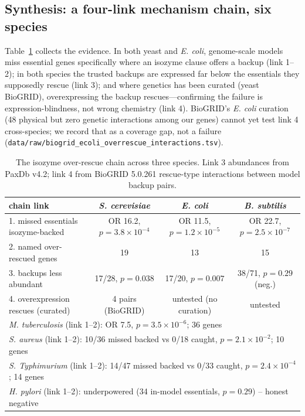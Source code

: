 \documentclass[12pt]{article}
\begin{document}
\subsection{Synthesis: a four-link mechanism chain, six species}
Table~\ref{tab:chain} collects the evidence. In both yeast and
\emph{E. coli}, genome-scale models miss essential genes specifically
where an isozyme clause offers a backup (link 1--2); in both species the
trusted backups are expressed far below the essentials they supposedly
rescue (link 3); and where genetics has been curated (yeast BioGRID),
overexpressing the backup rescues---confirming the failure is
expression-blindness, not wrong chemistry (link 4). BioGRID's
\emph{E. coli} curation (48 physical but zero genetic interactions
among our genes) cannot yet test link 4 cross-species; we record that
as a coverage gap, not a failure
(\texttt{data/raw/biogrid\_ecoli\_overrescue\_interactions.tsv}).
\begin{table}[h]
\centering\small
\begin{tabular}{lccc}
\hline\hline
chain link & \emph{S. cerevisiae} & \emph{E. coli} & \emph{B. subtilis} \\
\hline
1. missed essentials isozyme-backed & OR 16.2, $p=3.8\times10^{-4}$ & OR 11.5, $p=1.2\times10^{-5}$ & OR 22.7, $p=2.5\times10^{-7}$ \\
2. named over-rescued genes & 19 & 13 & 15 \\
3. backups less abundant & 17/28, $p=0.038$ & 17/20, $p=0.007$ & 38/71, $p=0.29$ (neg.) \\
4. overexpression rescues (curated) & 4 pairs (BioGRID) & untested (no curation) & untested \\
\hline
\multicolumn{4}{l}{\emph{M. tuberculosis} (link 1--2): OR 7.5, $p=3.5\times10^{-6}$; 36 genes} \\
\multicolumn{4}{l}{\emph{S. aureus} (link 1--2): 10/36 missed backed vs 0/18 caught, $p=2.1\times10^{-2}$; 10 genes} \\
\multicolumn{4}{l}{\emph{S. Typhimurium} (link 1--2): 14/47 missed backed vs 0/33 caught, $p=2.4\times10^{-4}$; 14 genes} \\
\multicolumn{4}{l}{\emph{H. pylori} (link 1--2): underpowered (34 in-model essentials, $p=0.29$) -- honest negative} \\
\hline
\end{tabular}
\caption{The isozyme over-rescue chain across three species. Link 3
abundances from PaxDb v4.2; link 4 from BioGRID 5.0.261 rescue-type
interactions between model backup pairs.}
\label{tab:chain}
\end{table}
\end{document}
